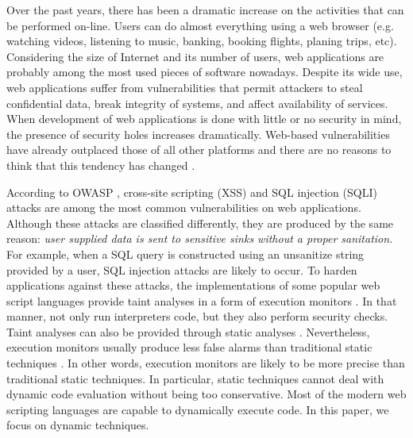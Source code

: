 \documentclass[oribibl]{llncs}
\begin{document}
Over the past years, there has been a dramatic increase 
on the activities that can be performed on-line.
Users can do almost everything  
using a web browser (e.g. 
watching videos, listening to music, banking, booking flights, planing 
trips, etc). Considering the size of Internet and its number of users, 
web applications are probably among the most used pieces of
software nowadays.
Despite its wide use, web applications suffer 
from vulnerabilities that permit attackers to 
steal confidential data, break integrity of systems, 
and affect availability of services. 
When development of web applications is done 
with little or no
security in mind,  
the presence of security holes increases dramatically.
Web-based vulnerabilities have already  
outplaced those of all other platforms 
\cite{StateWebSecurity} 
and there are 
no reasons to think that this tendency has changed
\cite{FFAWebSecurity}.

According to OWASP \cite{OWASP:Top10:2007}, 
cross-site scripting (XSS) and SQL injection (SQLI) attacks are among 
the most common vulnerabilities on web applications.
Although these attacks are classified differently, they are produced 
by the same 
reason: \emph{user supplied data is sent to sensitive sinks 
without a proper sanitation}.
For example, 
when a SQL query is constructed using an unsanitize string provided by a user, 
SQL injection attacks are likely to occur.
To harden applications against these attacks, 
the implementations of some popular web script languages 
provide taint analyses in a form 
of execution monitors \cite{Perl,Ruby}. In that manner, not only run 
interpreters code, but they also perform security checks. Taint
analyses can also be provided through static analyses \cite{WebSSARI,Jovanovic06pixy:a}. 
Nevertheless, execution monitors usually produce
less false alarms 
than traditional static techniques
\cite{Sabelfeld:Russo:PSI09}. In other words, 
execution monitors are likely to be more precise than traditional static techniques. 
In particular, static techniques cannot  
deal with dynamic code evaluation
without being too conservative. Most of the modern web scripting 
languages are capable to dynamically execute code. 
In this paper, we focus on dynamic techniques.
\end{document}
